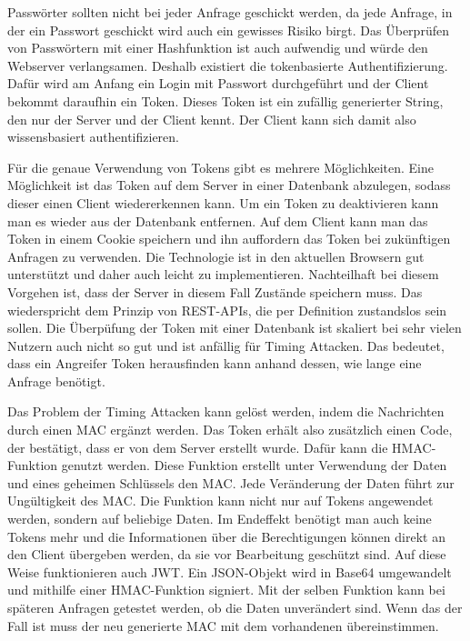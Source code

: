 Passwörter sollten nicht bei jeder Anfrage geschickt werden, da jede Anfrage, in der ein Passwort geschickt wird auch ein gewisses Risiko birgt. Das Überprüfen von Passwörtern mit einer Hashfunktion ist auch aufwendig und würde den Webserver verlangsamen. Deshalb existiert die tokenbasierte Authentifizierung. Dafür wird am Anfang ein Login mit Passwort durchgeführt und der Client bekommt daraufhin ein Token. Dieses Token ist ein zufällig generierter String, den nur der Server und der Client kennt. Der Client kann sich damit also wissensbasiert authentifizieren. 

Für die genaue Verwendung von Tokens gibt es mehrere Möglichkeiten. Eine Möglichkeit ist das Token auf dem Server in einer Datenbank abzulegen, sodass dieser einen Client wiedererkennen kann. Um ein Token zu deaktivieren kann man es wieder aus der Datenbank entfernen. Auf dem Client kann man das Token in einem Cookie speichern und ihn auffordern das Token bei zukünftigen Anfragen zu verwenden. Die Technologie ist in den aktuellen Browsern gut unterstützt und daher auch leicht zu implementieren. Nachteilhaft bei diesem Vorgehen ist, dass der Server in diesem Fall Zustände speichern muss. Das wiederspricht dem Prinzip von REST-APIs, die per Definition zustandslos sein sollen. Die Überpüfung der Token mit einer Datenbank ist skaliert bei sehr vielen Nutzern auch nicht so gut und ist anfällig für Timing Attacken. Das bedeutet, dass ein Angreifer Token herausfinden kann anhand dessen, wie lange eine Anfrage benötigt.

Das Problem der Timing Attacken kann gelöst werden, indem die Nachrichten durch einen \ac{MAC} ergänzt werden. Das Token erhält also zusätzlich einen Code, der bestätigt, dass er von dem Server erstellt wurde. Dafür kann die \ac{HMAC}-Funktion genutzt werden. Diese Funktion erstellt unter Verwendung der Daten und eines geheimen Schlüssels den \ac{MAC}. Jede Veränderung der Daten führt zur Ungültigkeit des \ac{MAC}. Die Funktion kann nicht nur auf Tokens angewendet werden, sondern auf beliebige Daten. Im Endeffekt benötigt man auch keine Tokens mehr und die Informationen über die Berechtigungen können direkt an den Client übergeben werden, da sie vor Bearbeitung geschützt sind. Auf diese Weise funktionieren auch \ac{JWT}. Ein JSON-Objekt wird in Base64 umgewandelt und mithilfe einer \ac{HMAC}-Funktion signiert. Mit der selben Funktion kann bei späteren Anfragen getestet werden, ob die Daten unverändert sind. Wenn das der Fall ist muss der neu generierte \ac{MAC} mit dem vorhandenen übereinstimmen.
\cite{madden_api_2020}\cite{software_development_engineering_advisor_at_fiserv_usa_architecting_2023}


